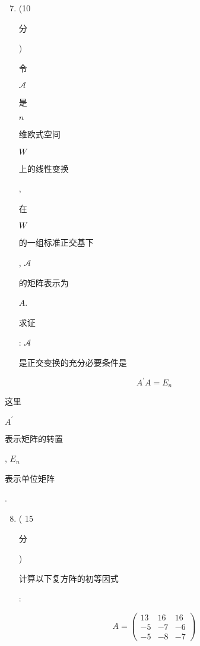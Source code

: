 \documentclass[10pt]{article}
\begin{document}
\begin{enumerate}
  \setcounter{enumi}{6}
  \item (10 \begin{CJK}{UTF8}{mj}分\end{CJK}) \begin{CJK}{UTF8}{mj}令\end{CJK} $\mathscr{A}$ \begin{CJK}{UTF8}{mj}是\end{CJK} $n$ \begin{CJK}{UTF8}{mj}维欧式空间\end{CJK} $W$ \begin{CJK}{UTF8}{mj}上的线性变换\end{CJK}, \begin{CJK}{UTF8}{mj}在\end{CJK} $W$ \begin{CJK}{UTF8}{mj}的一组标准正交基下\end{CJK}, $\mathscr{A}$ \begin{CJK}{UTF8}{mj}的矩阵表示为\end{CJK} $A$. \begin{CJK}{UTF8}{mj}求证\end{CJK}: $\mathscr{A}$ \begin{CJK}{UTF8}{mj}是正交变换的充分必要条件是\end{CJK}
\end{enumerate}
$$
A^{\prime} A=E_{n}
$$
\begin{CJK}{UTF8}{mj}这里\end{CJK} $A^{\prime}$ \begin{CJK}{UTF8}{mj}表示矩阵的转置\end{CJK}, $E_{n}$ \begin{CJK}{UTF8}{mj}表示单位矩阵\end{CJK}.

\begin{enumerate}
  \setcounter{enumi}{7}
  \item ( 15 \begin{CJK}{UTF8}{mj}分\end{CJK}) \begin{CJK}{UTF8}{mj}计算以下复方阵的初等因式\end{CJK}:
\end{enumerate}
$$
A=\left(\begin{array}{ccc}
13 & 16 & 16 \\
-5 & -7 & -6 \\
-5 & -8 & -7
\end{array}\right)
$$
\end{document}
